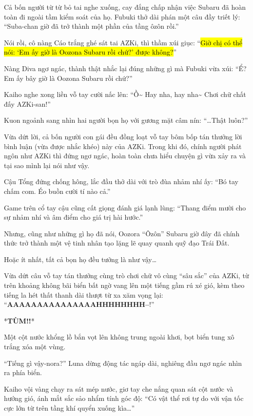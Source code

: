 \documentclass[../main.tex]{subfiles}
\begin{document}
Cả bốn người từ từ bỏ tai nghe xuống, cay đắng chấp nhận việc Subaru đã hoàn toàn đi ngoài tầm kiểm soát của họ. Fubuki thở dài phán một câu đầy triết lý: ``Suba-chan giờ đã trở thành một phần của tầng ôzôn rồi.''

Nói rồi, cô nàng Cáo trắng ghé sát tai AZKi, thì thầm xúi giục: ``\hl{Giờ chị có thể nói: `Em ấy giờ là Oozona Subaru rồi chứ?' được không?}''

Nàng Diva ngơ ngác, thành thật nhắc lại đúng những gì mà Fubuki vừa xúi: ``Ể? Em ấy bây giờ là Oozona Subaru rồi chứ?''

Kaiho nghe xong liền vỗ tay cười nấc lên: ``Ồ\~{} Hay nha, hay nha\~{} Chơi chữ chất đấy AZKi-san!''

Kuon ngoảnh sang nhìn hai người bọn họ với gương mặt câm nín: ``\dots Thật luôn?''

Vừa dứt lời, cả bốn người con gái đều đồng loạt vỗ tay bôm bốp tán thưởng lời bình luận (vừa được nhắc khéo) này của AZKi. Trong khi đó, chính người phát ngôn như AZKi thì đứng ngơ ngác, hoàn toàn chưa hiểu chuyện gì vừa xảy ra và tại sao mình lại nói như vậy.


Cậu Tổng đứng chống hông, lắc đầu thở dài với trò đùa nhảm nhí ấy: ``Bó tay chấm com. Éo buồn cười tí nào cả.''

Game trên cổ tay cậu cũng cất giọng đánh giá lạnh lùng: ``Thang điểm mười cho sự nhảm nhí và âm điểm cho giá trị hài hước.''

Nhưng, cũng như những gì họ đã nói, Oozora ``Ôzôn'' Subaru giờ đây đã chính thức trở thành một vệ tinh nhân tạo lặng lẽ quay quanh quỹ đạo Trái Đất.

\omk

Hoặc ít nhất, tất cả bọn họ đều tưởng là như vậy\dots

Vừa dứt câu vỗ tay tán thưởng cùng trò chơi chữ vô cùng ``sâu sắc'' của AZKi, từ trên khoảng không bãi biển bất ngờ vang lên một tiếng gầm rú xé gió, kèm theo tiếng la hét thất thanh dài thượt từ xa xăm vọng lại: ``\textbf{AAAAAAAAAAAAAAAHHHHHHHH--}!''

*\textbf{TÙM!!}*

Một cột nước khổng lồ bắn vọt lên không trung ngoài khơi, bọt biển tung xô trắng xóa một vùng.

``Tiếng gì vậy-nora?'' Luna dừng động tác ngáp dài, nghiêng đầu ngơ ngác nhìn ra phía biển.

Kaiho vội vàng chạy ra sát mép nước, giơ tay che nắng quan sát cột nước và hướng gió, ánh mắt sắc sảo nhẩm tính góc độ: ``Có vật thể rơi tự do với vận tốc cực lớn từ trên tầng khí quyển xuống kìa\dots''
\end{document}
